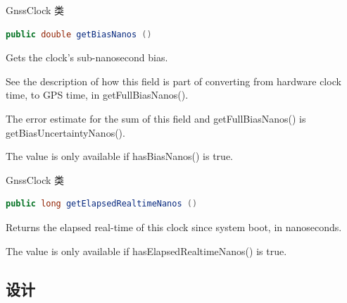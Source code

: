 \documentclass{beamer} %
\begin{document}
\begin{frame}[fragile]{GnssClock 类}
    \begin{lstlisting}[language = Java]
public double getBiasNanos ()
    \end{lstlisting}
    Gets the clock's sub-nanosecond bias.

    See the description of how this field is part of converting from hardware clock time, to GPS time, in getFullBiasNanos().

    The error estimate for the sum of this field and getFullBiasNanos() is getBiasUncertaintyNanos().

    The value is only available if hasBiasNanos() is true.
\end{frame}

\begin{frame}[fragile]{GnssClock 类}
    \begin{lstlisting}[language = Java]
public long getElapsedRealtimeNanos ()
    \end{lstlisting}
    Returns the elapsed real-time of this clock since system boot, in nanoseconds.

    The value is only available if hasElapsedRealtimeNanos() is true.
\end{frame}


\subsection{设计}
\end{document}
